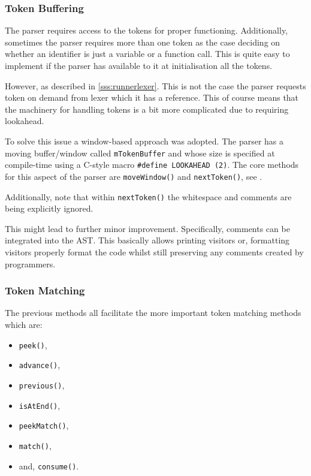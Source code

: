 \subsubsection{Token Buffering}

The parser requires access to the tokens for proper functioning.
Additionally, sometimes the parser requires more than one token
as the case deciding on whether an identifier is just a variable
or a function call. This is quite easy to implement if the
parser has available to it at initialisation all the tokens.

However, as described in \ref{sss:runnerlexer}. This is not the
case the parser requests token on demand from lexer which it has
a reference. This of course means that the machinery for
handling tokens is a bit more complicated due to requiring
lookahead.

To solve this issue a window-based approach was adopted. The
parser has a moving buffer/window called \texttt{mTokenBuffer}
and whose size is specified at compile-time using a C-style
macro \texttt{\#define LOOKAHEAD (2)}. The core methods for this
aspect of the parser are \texttt{moveWindow()} and
\texttt{nextToken()}, see .



Additionally, note that within \texttt{nextToken()} the
whitespace and comments are being explicitly ignored.

This might lead to further minor improvement. Specifically,
comments can be integrated into the AST. This basically allows
printing visitors or, formatting visitors properly format the
code whilst still preserving any comments created by
programmers.

\subsubsection{Token Matching}

The previous methods all facilitate the more important token
matching methods which are:

\begin{itemize}
    \item \texttt{peek()},
    \item \texttt{advance()},
    \item \texttt{previous()},
    \item \texttt{isAtEnd()},
    \item \texttt{peekMatch()},
    \item \texttt{match()},
    \item and, \texttt{consume()}.
\end{itemize}

